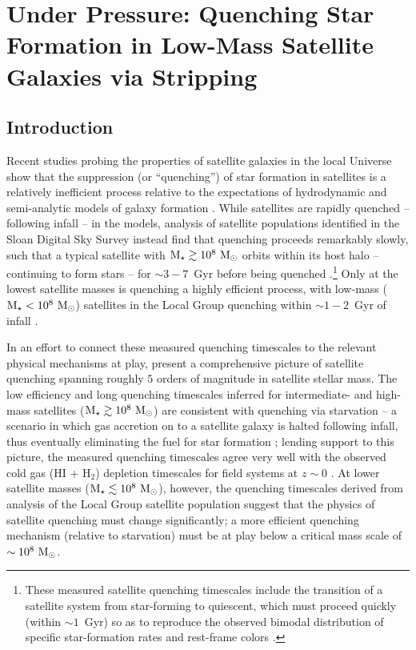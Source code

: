 \chapter{Under Pressure: Quenching Star Formation in Low-Mass Satellite Galaxies via
  Stripping}

\section{Introduction}
\label{sec:intro} 

Recent studies probing the properties of satellite galaxies in the
local Universe show that the suppression (or ``quenching'') of star
formation in satellites is a relatively inefficient process relative
to the expectations of hydrodynamic and semi-analytic models of galaxy
formation \citep[e.g.][]{kimm09, kimm11, wang14, hirschmann14,
  phillips15a}.
%
While satellites are rapidly quenched -- following infall -- in the
models, analysis of satellite populations identified in the Sloan
Digital Sky Survey \citep[SDSS,][]{york00} instead find that quenching
proceeds remarkably slowly, such that a typical satellite with ${\rm M}_{\star}
\gtrsim 10^{8}~{\rm M}_{\odot}$ orbits within its host halo -- continuing to
form stars -- for $\sim3-7$~Gyr before being quenched
\citep{delucia12, wetzel13, wheeler14}.\footnote{These measured
  satellite quenching timescales include the transition of a satellite
  system from star-forming to quiescent, which must proceed quickly
  (within $\sim1$~Gyr) so as to reproduce the observed bimodal
  distribution of specific star-formation rates and rest-frame colors
  \citep{balogh04, wetzel13}.}
%
Only at the lowest satellite masses is quenching a highly efficient
process, with low-mass (${\rm M}_{\star} < 10^{8}~{\rm M}_{\odot}$) satellites in the
Local Group quenching within $\sim1-2$~Gyr of infall \citep{weisz15,
  wetzel15b, fham15}.



In an effort to connect these measured quenching timescales to the
relevant physical mechanisms at play, \citet{fham15} present
a comprehensive picture of satellite quenching spanning
roughly $5$ orders of magnitude in satellite stellar mass.
%
The low efficiency and long quenching timescales inferred for
intermediate- and high-mass satellites (${\rm M}_{\star} \gtrsim 10^{8}~{\rm M}_{\odot}$)
are consistent with quenching via starvation -- a scenario in which
gas accretion on to a satellite galaxy is halted following infall,
thus eventually eliminating the fuel for star formation
\citep{larson80, kawata08};
%
lending support to this picture, the measured quenching timescales
agree very well with the observed cold gas (H{\scriptsize I} +
H$_{2}$) depletion timescales for field systems at $z \sim 0$
\citep{fham15}.
%
At lower satellite masses (${\rm M}_{\star} \lesssim 10^{8}~{\rm M}_{\odot}$), however,
the quenching timescales derived from analysis of the Local Group
satellite population suggest that the physics of satellite quenching
must change significantly; a more efficient quenching mechanism
(relative to starvation) must be at play below a critical mass scale
of $\sim10^{8}~{\rm M}_{\odot}$.


